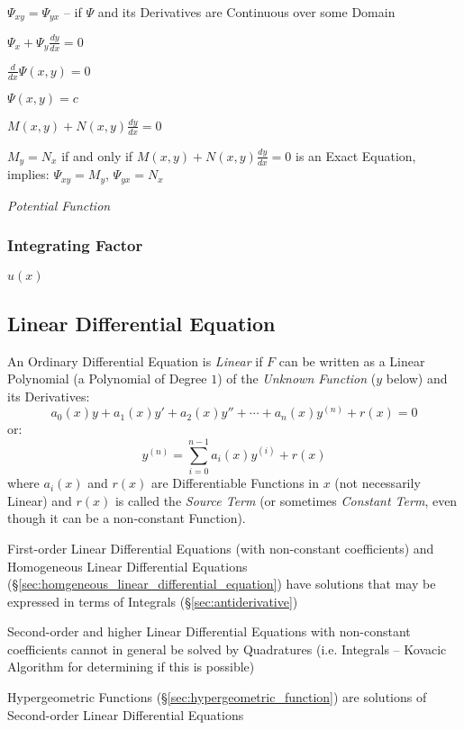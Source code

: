 $\Psi_{xy} = \Psi_{yx}$ -- if $\Psi$ and its Derivatives are Continuous over
some Domain

$\Psi_x + \Psi_y \frac{dy}{dx} = 0$

$\frac{d}{dx}\Psi(x,y) = 0$

$\Psi(x,y) = c$

$M(x,y) + N(x,y)\frac{dy}{dx} = 0$

$M_y = N_x$ if and only if $M(x,y) + N(x,y)\frac{dy}{dx} = 0$ is an Exact
Equation, implies: $\Psi_{xy} = M_y$, $\Psi_{yx} = N_x$

\emph{Potential Function}



\subsubsection{Integrating Factor}\label{sec:integrating_factor}

$u(x)$



\subsection{Linear Differential Equation}
\label{sec:linear_differential_equation}

An Ordinary Differential Equation is \emph{Linear} if $F$ can be written as a
Linear Polynomial (a Polynomial of Degree $1$) of the \emph{Unknown Function}
($y$ below) and its Derivatives:
\[
  a_0(x)y + a_1(x)y' + a_2(x)y'' + \cdots + a_n(x)y^{(n)} + r(x) = 0
\]
or:
\[
  y^{(n)} = \sum_{i=0}^{n-1} a_i(x) y^{(i)} + r(x)
\]
where $a_i(x)$ and $r(x)$ are Differentiable Functions in $x$ (not necessarily
Linear) and $r(x)$ is called the \emph{Source Term} (or sometimes
\emph{Constant Term}, even though it can be a non-constant Function).

First-order Linear Differential Equations (with non-constant coefficients) and
Homogeneous Linear Differential Equations
(\S\ref{sec:homgeneous_linear_differential_equation}) have solutions that may
be expressed in terms of Integrals (\S\ref{sec:antiderivative})

Second-order and higher Linear Differential Equations with non-constant
coefficients cannot in general be solved by Quadratures (i.e. Integrals --
Kovacic Algorithm for determining if this is possible)

Hypergeometric Functions (\S\ref{sec:hypergeometric_function}) are solutions of
Second-order Linear Differential Equations

